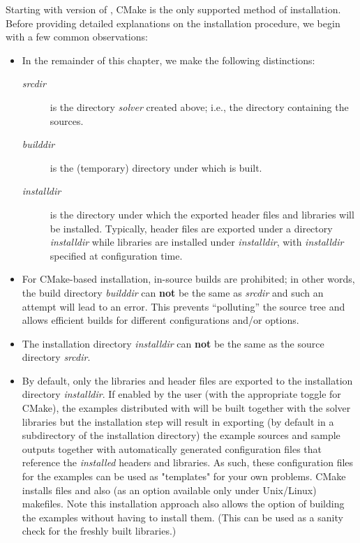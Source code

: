 Starting with version  of {\sundials}, CMake is the only supported method
of installation.
Before providing detailed explanations on the installation procedure, we begin with a few common observations:
\begin{itemize}

\item In the remainder of this chapter, we make the following distinctions:
  \begin{description}
  \item[{\em srcdir}] 
    is the directory {\em solver} created above; i.e., the 
    directory containing the {\sundials} sources.
  \item[{\em builddir}]
    is the (temporary) directory under which {\sundials} is built.
  \item[{\em installdir}]
    is the directory under which the {\sundials} exported header files
    and libraries will be installed. Typically, header files are exported under a directory
    {\em installdir} while libraries are installed under {\em installdir},
    with {\em installdir} specified at configuration time.
  \end{description}

\item For {\sundials} CMake-based installation, in-source builds are prohibited; in other words, the
  build directory {\em builddir} can {\bf not} be the same as {\em srcdir}
  and such an attempt will lead to an error. This
  prevents ``polluting'' the source tree and allows efficient builds
  for different configurations and/or options.

\item {\warn}The installation directory {\em installdir} can {\bf not} be the same as
  the source directory {\em srcdir}.

\item By default, only the libraries and header files are exported to the installation
  directory {\em installdir}.  If enabled by the user (with the
  appropriate toggle for CMake), the
  examples distributed with {\sundials} will be built together with
  the solver libraries but the installation step will result in
  exporting (by default in a subdirectory of the installation
  directory) the example sources and sample outputs together with
  automatically generated configuration files that reference the {\em
  installed} {\sundials} headers and libraries.  As such, these
  configuration files for the {\sundials} examples can be used as
  "templates" for your own problems. CMake installs  files and also
  (as an option available only under Unix/Linux) makefiles. Note this
  installation approach also allows the option of building the
  {\sundials} examples without having to install them.  (This can be
  used as a sanity check for the freshly built libraries.)


\end{itemize}
